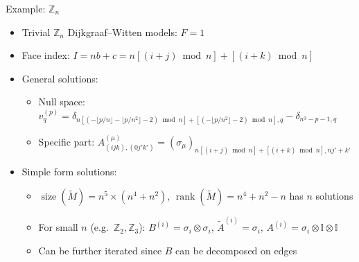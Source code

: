 \documentclass{fdubeamer}
\newcommand{\1}{\mathbb{1}}
\newcommand{\I}{\mathbb{I}}
\newcommand{\Z}{\mathbb{Z}}
\DeclareMathOperator{\rank}{rank}
\begin{document}
\begin{frame}{Example: \texorpdfstring{$\Z_n$}{ℤₙ}}

\begin{itemize}
  \item Trivial $\Z_n$ Dijkgraaf--Witten models: $F=1$
  \item Face index: $I = nb + c = n [(i+j)\bmod n] + [(i+k)\bmod n]$
  \item General solutions:

    \begin{itemize}
      \item Null space:
        $
            v^{(p)}_q = \delta_{n [(- \lfloor p/n\rfloor - \lfloor p/n^2 \rfloor - 2) \bmod n] + [(- \lfloor p/n^2 \rfloor - 2) \bmod n], q}
          - \delta_{n^3-p-1, q}
        $
      \item Specific part:
        $A^{(\mu)}_{(ijk), (0j'k')} = (\sigma_\mu)_{n[(i+j)\bmod n]+[(i+k)\bmod n], nj'+k'}$
    \end{itemize}

  \item Simple form solutions:

    \begin{itemize}
      \item $\operatorname{size}(\tilde{M})=n^5\times(n^4+n^2), \, \rank(\tilde{M})=n^4+n^2-n$
        \textrightarrow{} has $n$ solutions
      \item For small $n$ (e.g.\ $\Z_2, \Z_3$):
        $B^{(i)} = \sigma_i \otimes \sigma_i, \, \tilde{A}^{(i)} = \sigma_i, \, A^{(i)} = \sigma_i \otimes \I \otimes \I$
      \item Can be further iterated since $B$ can be decomposed on edges
    \end{itemize}
\end{itemize}

\end{frame}
\end{document}
